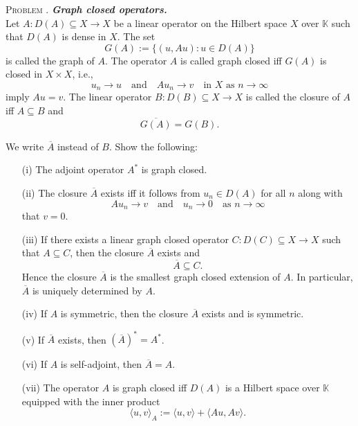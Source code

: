 \documentclass[12pt, a4paper, oneside]{ctexart}
\newcounter{problemname}
\newenvironment{problem}{\begin{framed}\stepcounter{problemname}\par\noindent\textsc{Problem \arabic{problemname}. }}{\end{framed}\par}
\begin{document}
	\begin{problem}
		\textit{\textbf{Graph closed operators.}}\\ Let $A : D(A) \subseteq X \to X$ be a linear operator 
		on the Hilbert space $X$ over $\mathbb{K}$ such that $D(A)$ is dense in $X$. The set
		\[
		G(A) := \{(u, Au) : u \in D(A)\}
		\]
		is called the graph of $A$. The operator $A$ is called graph closed iff $G(A)$ is 
		closed in $X \times X$, i.e.,
		\[
		u_n \to u \quad \text{and} \quad Au_n \to v \quad \text{in } X \text{ as } n \to \infty
		\]
		imply $Au = v$. The linear operator $B : D(B) \subseteq X \to X$ is called the closure of $A$ iff $A \subseteq B$ and
		\[
		\overline{G(A)} = G(B).
		\]
		   
		We write $\overline{A}$ instead of $B$. Show the following:
		
		\begin{enumerate}
			\item[(i)] The adjoint operator $A^*$ is graph closed.
			\item[(ii)] The closure $\overline{A}$ exists iff it follows from $u_n \in D(A)$ for all $n$ along with
			\[
			Au_n \to v \quad \text{and} \quad u_n \to 0 \quad \text{as } n \to \infty
			\]
			that $v = 0$.
			\item[(iii)] If there exists a linear graph closed operator $C : D(C) \subseteq X \to X$ such that $A \subseteq C$, 
			then the closure $\overline{A}$ exists and
			\[
			\overline{A} \subseteq C.
			\]
			Hence the closure $\overline{A}$ is the smallest graph closed extension of $A$. In particular, $\overline{A}$ is uniquely determined by $A$.
			\item[(iv)] If $A$ is symmetric, then the closure $\overline{A}$ exists and is symmetric.
			\item[(v)] If $\overline{A}$ exists, then $(\overline{A})^* = A^*$.
			\item[(vi)] If $A$ is self-adjoint, then $\overline{A} = A$.
			\item[(vii)] The operator $A$ is graph closed iff $D(A)$ is a Hilbert space over $\mathbb{K}$ equipped with the inner product
			\[
			\langle u , v\rangle_A := \langle u , v\rangle + \langle Au , Av\rangle.
			\]
		\end{enumerate}
		
	\end{problem}
	
\end{document}
